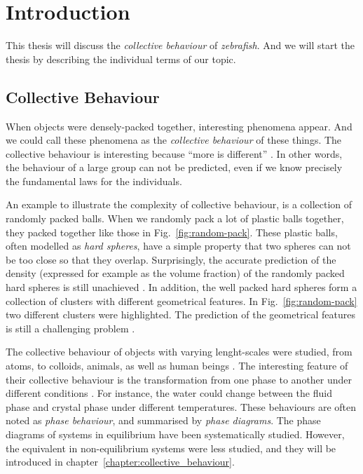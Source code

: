 \documentclass[11pt,twoside]{report}
\begin{document}
\chapter{Introduction}

This thesis will discuss the \emph{collective behaviour} of \emph{zebrafish}. And we will start the thesis by describing the individual terms of our topic.

\section{Collective Behaviour}

When objects were densely-packed together, interesting phenomena  appear. And we could call these phenomena as the \emph{collective behaviour} of these things. The collective behaviour is interesting because ``more is different'' \cite{anderson1972}. In other words, the behaviour of a large group can not be predicted, even if we know precisely the fundamental laws for the individuals.

An example to illustrate the complexity of collective behaviour, is a collection of randomly packed balls. When we randomly pack a lot of plastic balls together, they packed together like those in Fig.~\ref{fig:random-pack}. These plastic balls, often modelled as \emph{hard spheres}, have a simple property that two spheres can not be too close so that they overlap.
Surprisingly, the accurate prediction of the density (expressed for example as the volume fraction) of the randomly packed hard spheres is still unachieved \cite{kamien2007, zaccone2022}.
In addition, the well packed hard spheres form a collection of clusters with different geometrical features. In Fig.~\ref{fig:random-pack} two different clusters were highlighted. The prediction of the geometrical features is still a challenging problem \cite{malins2013, robinson2019}.

The collective behaviour of objects with varying lenght-scales were studied, from atoms, to colloids, animals, as well as human beings \cite{walker1990, lekkerkerker1992, becco2006, henderson1971, silverberg2013}. The interesting feature of their collective behaviour is the transformation from one phase to another under different conditions \cite{sethna2006}. For instance, the water could change between the fluid phase and crystal phase under different temperatures. These behaviours are often noted as \emph{phase behaviour}, and summarised by \emph{phase diagrams}. The phase diagrams of systems in equilibrium have been systematically studied. However, the equivalent in non-equilibrium systems were less studied, and they will be introduced in chapter~\ref{chapter:collective_behaviour}.
\end{document}
